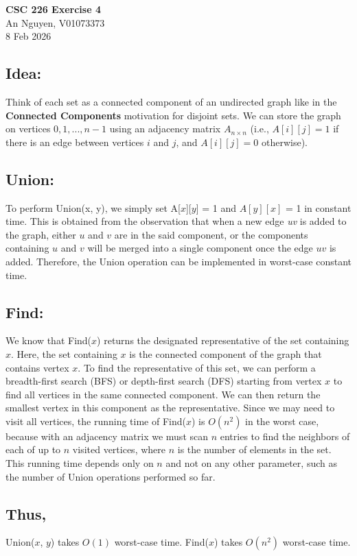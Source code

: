 \documentclass[12pt, b5paper]{article}
\begin{document}
\begin{center}
{\bf CSC 226
Exercise 4}\\
An Nguyen, V01073373\\
8 Feb 2026
\end{center}
\subsection*{Idea:}
Think of each set as a connected component of an undirected graph like 
in the \textbf{Connected Components} motivation for disjoint sets.
We can store the graph on vertices $0, 1, ..., n-1$ using an adjacency matrix $A_{n \times n}$ (i.e., $A[i][j] = 1$ if there is an edge between vertices $i$ and $j$, and $A[i][j] = 0$ otherwise).
\subsection*{Union:}
To perform Union(x, y), we simply set A[$x$][$y$] = 1 and $A[y][x]$ = 1 in constant time. This is obtained from the observation that when a new edge \textit{uv} is added to the graph,
either $u$ and $v$ are in the said component, or the components containing $u$ and $v$ will be merged into a single component
once the edge $uv$ is added. Therefore, the Union operation can be implemented in worst-case constant time.
\subsection*{Find:}
We know that Find($x$) returns the designated representative of the set containing $x$. Here, the set containing $x$ is the connected component of the graph that contains vertex $x$. 
To find the representative of this set, we can perform a breadth-first search (BFS) or depth-first search (DFS) starting from vertex $x$ to find all vertices in the same connected component. 
We can then return the smallest vertex in this component as the representative. Since we may need to visit all vertices, the running time of Find($x$) is $O(n^2)$ in the worst 
case, because with an adjacency matrix we must scan $n$ entries to find the neighbors of each of up to $n$ visited vertices, where $n$ is the number of elements in the set. This running time depends only on $n$ and not on any other parameter, such as the number of Union operations performed so far.
\subsection*{Thus,}
Union($x$, $y$) takes $O(1)$ worst-case time.
Find($x$) takes $O(n^2)$ worst-case time.
\end{document}
